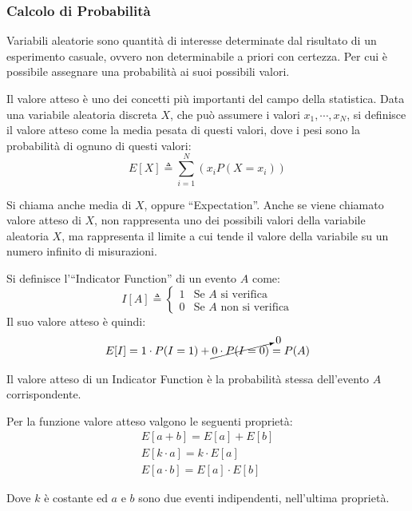\documentclass{article}
\numberwithin{equation}{subsection}
\begin{document}
\subsubsection{Calcolo di Probabilità}

Variabili aleatorie sono quantità di interesse determinate dal risultato di un esperimento 
casuale, ovvero non determinabile a priori con certezza. Per cui è possibile 
assegnare una probabilità ai suoi possibili valori. 

Il valore atteso è uno dei concetti più importanti del campo della statistica. Data 
una variabile aleatoria discreta $X$, che può assumere i valori $x_1,\cdots,x_N$, si definisce il valore atteso come la media pesata di questi valori, dove i pesi sono 
la probabilità di ognuno di questi valori:
\begin{equation}
    E[X]\triangleq\sum_{i=1}^N(x_iP(X=x_i))
\end{equation}

Si chiama anche media di $X$, oppure ``Expectation''. Anche se viene chiamato valore 
atteso di $X$, non rappresenta uno dei possibili valori della variabile aleatoria $X$, ma 
rappresenta il limite a cui tende il valore della variabile su un numero infinito di 
misurazioni. 

Si definisce l'``Indicator Function'' di un evento $A$ come:
\begin{equation*}
    I[A]\triangleq\begin{cases}
        1&\text{Se }A\text{ si verifica}\\
        0&\text{Se }A\text{ non si verifica}
    \end{cases}
\end{equation*}
Il suo valore atteso è quindi:
\begin{equation*}
    E[I]=1\cdot P(I=1)+\cancelto{0}{0\cdot P(I=0)}=P(A)
\end{equation*}

Il valore atteso di un Indicator Function è la probabilità stessa dell'evento $A$ corrispondente. 

Per la funzione valore atteso valgono le seguenti proprietà:
\begin{gather*}
    E[a+b]=E[a]+E[b]\\
    E[k\cdot a]=k\cdot E[a]\\
    E[a\cdot b]=E[a]\cdot E[b]
\end{gather*}

Dove $k$ è costante ed $a$ e $b$ sono due eventi indipendenti, nell'ultima proprietà. 
\end{document}
